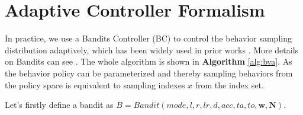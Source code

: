 \documentclass[nohyperref]{article}
\theoremstyle{plain}
\begin{document}
\clearpage

\section{Adaptive Controller Formalism}
\label{Sec: appendix MAB}

In practice, we use a Bandits Controller (BC) to control the behavior sampling distribution adaptively, which has been widely used in prior works \citep{agent57,casa_entropy}. More details on Bandits  can see \citep{sutton}. The whole algorithm is shown in \textbf{Algorithm} \ref{alg:bva}. As the behavior policy can be parameterized and thereby sampling behaviors from the policy space is equivalent to sampling indexes $x$ from the index set. 

Let's firstly define a bandit as $B = Bandit(mode, l, r, lr, d, acc, ta, to, \textbf{w}, \textbf{N})$.
\end{document}
